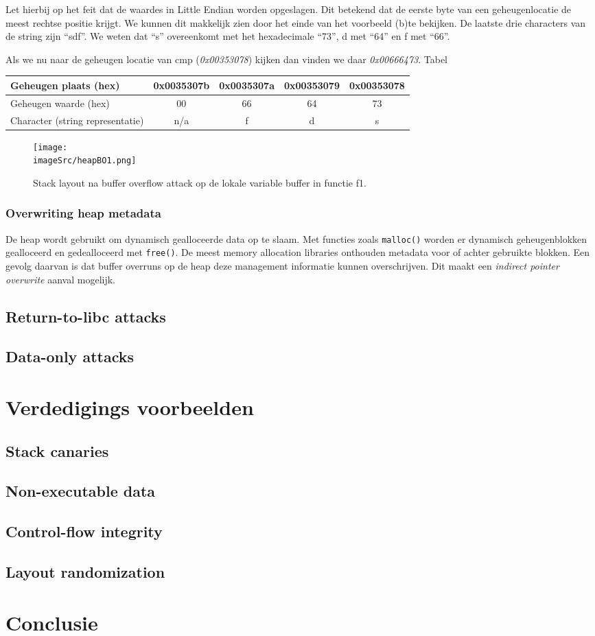 \documentclass[../main.tex]{subfiles}
\begin{document}
Let hierbij op het feit dat de waardes in Little Endian worden opgeslagen.
Dit betekend dat de eerste byte van een geheugenlocatie de meest rechtse positie krijgt.
We kunnen dit makkelijk zien door het einde van het voorbeeld (b)te bekijken. De laatste drie characters van de string zijn ``sdf''.
We weten dat ``s'' overeenkomt met het hexadecimale ``73'', d met ``64'' en f met ``66''.

Als we nu naar de geheugen locatie van cmp (\emph{0x00353078}) kijken dan vinden we daar \emph{0x00666473}. 
Tabel
\begin{table}
\centering 
\begin{tabular}{l|cccc|}
		Geheugen plaats (hex) & 0x0035307b & 0x0035307a & 0x00353079 & 0x00353078 \\ \hline
		Geheugen waarde (hex) & 00 & 66 & 64 & 73 \\ \hline
		Character (string representatie) & n/a & f & d & s \\ \hline   
\end{tabular}
\end{table}

\begin{figure}
\centering
\texttt{[image: \\imageSrc/heapBO1.png]}
\caption{Stack layout na buffer overflow attack op de lokale variable buffer in functie f1.}
\label{f:heapBO1}
\end{figure}

\subsubsection{Overwriting heap metadata}
De heap wordt gebruikt om dynamisch gealloceerde data op te slaam.
Met functies zoals \lstinline[style=cstyle]{malloc()} worden er dynamisch geheugenblokken gealloceerd en gedealloceerd met \lstinline[style=cstyle]{free()}.
De meest memory allocation libraries onthouden metadata voor of achter gebruikte blokken.
Een gevolg daarvan is dat buffer overruns op de heap deze management informatie kunnen overschrijven.
Dit maakt een \emph{indirect pointer overwrite} aanval mogelijk. 
\subsection{Return-to-libc attacks}
\subsection{Data-only attacks}
\section{Verdedigings voorbeelden}
\subsection{Stack canaries}
\subsection{Non-executable data}
\subsection{Control-flow integrity}
\subsection{Layout randomization}
\section{Conclusie}
\end{document}
